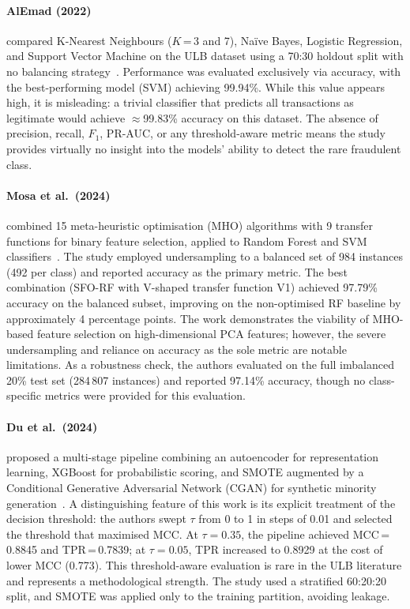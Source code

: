 \paragraph{AlEmad (2022)}
compared K-Nearest Neighbours ($K$\,=\,3 and 7), Naïve Bayes, Logistic Regression, and Support Vector Machine on the ULB dataset using a 70:30 holdout split with no balancing strategy~\cite{alemad2022credit}. Performance was evaluated exclusively via accuracy, with the best-performing model (SVM) achieving 99.94\%. While this value appears high, it is misleading: a trivial classifier that predicts all transactions as legitimate would achieve $\approx$99.83\% accuracy on this dataset. The absence of precision, recall, $F_1$, PR-AUC, or any threshold-aware metric means the study provides virtually no insight into the models' ability to detect the rare fraudulent class.

\paragraph{Mosa et al.\ (2024)}
combined 15 meta-heuristic optimisation (MHO) algorithms with 9 transfer functions for binary feature selection, applied to Random Forest and SVM classifiers~\cite{mosa2024ccfd}. The study employed undersampling to a balanced set of 984 instances (492 per class) and reported accuracy as the primary metric. The best combination (SFO-RF with V-shaped transfer function V1) achieved 97.79\% accuracy on the balanced subset, improving on the non-optimised RF baseline by approximately 4 percentage points. The work demonstrates the viability of MHO-based feature selection on high-dimensional PCA features; however, the severe undersampling and reliance on accuracy as the sole metric are notable limitations. As a robustness check, the authors evaluated on the full imbalanced 20\% test set (284\,807 instances) and reported 97.14\% accuracy, though no class-specific metrics were provided for this evaluation.

\paragraph{Du et al.\ (2024)}
proposed a multi-stage pipeline combining an autoencoder for representation learning, XGBoost for probabilistic scoring, and SMOTE augmented by a Conditional Generative Adversarial Network (CGAN) for synthetic minority generation~\cite{du2024novel}. A distinguishing feature of this work is its explicit treatment of the decision threshold: the authors swept $\tau$ from 0 to 1 in steps of 0.01 and selected the threshold that maximised MCC. At $\tau = 0.35$, the pipeline achieved MCC\,=\,0.8845 and TPR\,=\,0.7839; at $\tau = 0.05$, TPR increased to 0.8929 at the cost of lower MCC (0.773). This threshold-aware evaluation is rare in the ULB literature and represents a methodological strength. The study used a stratified 60:20:20 split, and SMOTE was applied only to the training partition, avoiding leakage.

